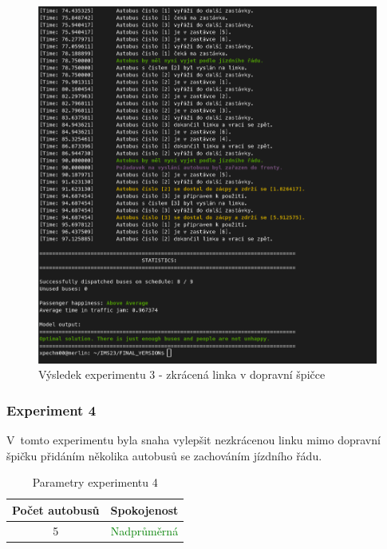 \documentclass[a4paper]{article}
\begin{document}
                \begin{figure}[H]
                \includegraphics[scale=0.48, keepaspectratio]{fig/ims_bus3.png}
                \caption{Výsledek experimentu 3 - zkrácená linka v dopravní špičce}
                \label{fig:experiment3}
            \end{figure}
            \newpage
            \subsubsection{Experiment 4}
            \label{subsubsec:experiment4}
                V~tomto experimentu byla snaha vylepšit nezkrácenou linku mimo dopravní špičku přidáním několika autobusů se zachováním jízdního řádu. 

                \begin{table}[H]
                	\centering
                	\begin{tabular}{ | c | c |}
                		\hline
                		Počet autobusů & Spokojenost\\
                		\hline
                		\hline
                		5 & \textcolor{green}{Nadprůměrná} \\
                		\hline
                	\end{tabular}
                	\caption{Parametry experimentu 4}
                	\label{tab:experiment4}
                \end{table}
\end{document}

